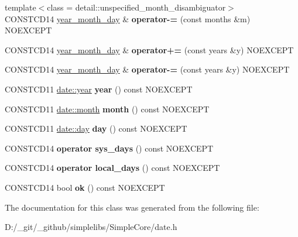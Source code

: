 \begin{DoxyCompactItemize}
\mbox{\label{classdate_1_1year__month__day_a992468798719816343dbb8a5cf1dd093}} 
{\footnotesize template$<$class  = detail\+::unspecified\+\_\+month\+\_\+disambiguator$>$ }\\C\+O\+N\+S\+T\+C\+D14 \mbox{\hyperlink{classdate_1_1year__month__day}{year\+\_\+month\+\_\+day}} \& {\bfseries operator-\/=} (const months \&m) N\+O\+E\+X\+C\+E\+PT
\item 
\mbox{\label{classdate_1_1year__month__day_a7ee7b9513b13c55d3b5fced8e390e587}} 
C\+O\+N\+S\+T\+C\+D14 \mbox{\hyperlink{classdate_1_1year__month__day}{year\+\_\+month\+\_\+day}} \& {\bfseries operator+=} (const years \&y) N\+O\+E\+X\+C\+E\+PT
\item 
\mbox{\label{classdate_1_1year__month__day_ae0f1ecb32c6412f5eb47f86b2cca148c}} 
C\+O\+N\+S\+T\+C\+D14 \mbox{\hyperlink{classdate_1_1year__month__day}{year\+\_\+month\+\_\+day}} \& {\bfseries operator-\/=} (const years \&y) N\+O\+E\+X\+C\+E\+PT
\item 
\mbox{\label{classdate_1_1year__month__day_a90fe176b8278fa7d049222df6f2d6fcf}} 
C\+O\+N\+S\+T\+C\+D11 \mbox{\hyperlink{classdate_1_1year}{date\+::year}} {\bfseries year} () const N\+O\+E\+X\+C\+E\+PT
\item 
\mbox{\label{classdate_1_1year__month__day_ae97c2bc7fccc3e4aec83035fff09e256}} 
C\+O\+N\+S\+T\+C\+D11 \mbox{\hyperlink{classdate_1_1month}{date\+::month}} {\bfseries month} () const N\+O\+E\+X\+C\+E\+PT
\item 
\mbox{\label{classdate_1_1year__month__day_a9f06a363a27cf6aab75b0df5ee57eeff}} 
C\+O\+N\+S\+T\+C\+D11 \mbox{\hyperlink{classdate_1_1day}{date\+::day}} {\bfseries day} () const N\+O\+E\+X\+C\+E\+PT
\item 
\mbox{\label{classdate_1_1year__month__day_ad5cbef46f987b9041384ca02b5547e60}} 
C\+O\+N\+S\+T\+C\+D14 {\bfseries operator sys\+\_\+days} () const N\+O\+E\+X\+C\+E\+PT
\item 
\mbox{\label{classdate_1_1year__month__day_aad54880900b2884e749ffbd63de2b204}} 
C\+O\+N\+S\+T\+C\+D14 {\bfseries operator local\+\_\+days} () const N\+O\+E\+X\+C\+E\+PT
\item 
\mbox{\label{classdate_1_1year__month__day_a97945fc698a22e803b05e7d75d0eb94a}} 
C\+O\+N\+S\+T\+C\+D14 bool {\bfseries ok} () const N\+O\+E\+X\+C\+E\+PT
\end{DoxyCompactItemize}


The documentation for this class was generated from the following file\+:\begin{DoxyCompactItemize}
\item 
D\+:/\+\_\+git/\+\_\+github/simplelibs/\+Simple\+Core/date.\+h\end{DoxyCompactItemize}
